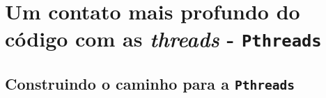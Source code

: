 \section{Um contato mais profundo do código com as \textit{threads} - \texttt{Pthreads}}
    
    \subsection{Construindo o caminho para a \texttt{Pthreads}}